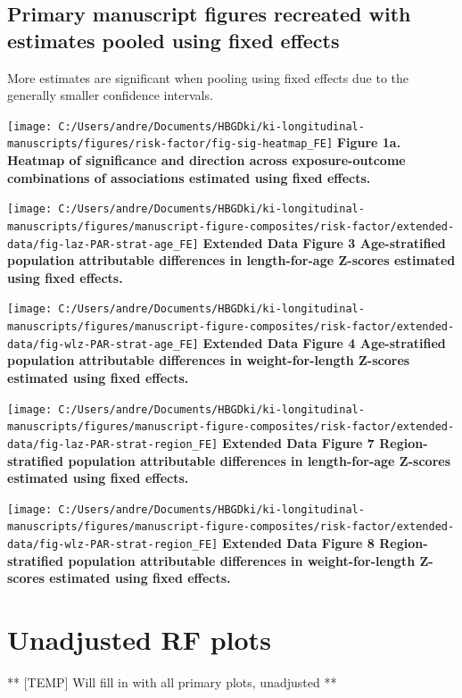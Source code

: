 \documentclass[9pt,]{book}
\begin{document}
\section{Primary manuscript figures recreated with estimates pooled
using fixed
effects}\label{primary-manuscript-figures-recreated-with-estimates-pooled-using-fixed-effects}

More estimates are significant when pooling using fixed effects due to
the generally smaller confidence intervals.

\texttt{[image: C:/Users/andre/Documents/HBGDki/ki-longitudinal-manuscripts/figures/risk-factor/fig-sig-heatmap\_FE]}
\textbf{Figure 1a. Heatmap of significance and direction across
exposure-outcome combinations of associations estimated using fixed
effects. }

\texttt{[image: C:/Users/andre/Documents/HBGDki/ki-longitudinal-manuscripts/figures/manuscript-figure-composites/risk-factor/extended-data/fig-laz-PAR-strat-age\_FE]}
\textbf{Extended Data Figure 3 \textbar{} Age-stratified population
attributable differences in length-for-age Z-scores estimated using
fixed effects. }

\texttt{[image: C:/Users/andre/Documents/HBGDki/ki-longitudinal-manuscripts/figures/manuscript-figure-composites/risk-factor/extended-data/fig-wlz-PAR-strat-age\_FE]}
\textbf{Extended Data Figure 4 \textbar{} Age-stratified population
attributable differences in weight-for-length Z-scores estimated using
fixed effects. }

\texttt{[image: C:/Users/andre/Documents/HBGDki/ki-longitudinal-manuscripts/figures/manuscript-figure-composites/risk-factor/extended-data/fig-laz-PAR-strat-region\_FE]}
\textbf{Extended Data Figure 7 \textbar{} Region-stratified population
attributable differences in length-for-age Z-scores estimated using
fixed effects. }

\texttt{[image: C:/Users/andre/Documents/HBGDki/ki-longitudinal-manuscripts/figures/manuscript-figure-composites/risk-factor/extended-data/fig-wlz-PAR-strat-region\_FE]}
\textbf{Extended Data Figure 8 \textbar{} Region-stratified population
attributable differences in weight-for-length Z-scores estimated using
fixed effects. }

\chapter{Unadjusted RF plots}\label{unadjusted}

\raggedright

** {[}TEMP{]} Will fill in with all primary plots, unadjusted **
\end{document}
